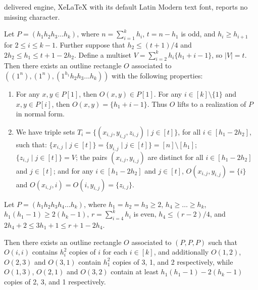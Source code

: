 \documentclass[10pt,a4paper]{amsart}
\begin{document}
delivered engine, XeLaTeX with its default Latin Modern text font, reports no missing character.
\begin{lemma}
\label{circulant_construction}
    Let $P=(h_1h_2h_3\dots h_k)$, where $n=\sum_{i=1}^k h_i$, $t=n-h_1$ is odd, and $h_i\ge h_{i+1}$ for $2\le i \le k-1$. Further suppose that $h_2 \le (t+1)/4$ and $2h_2 \le h_1 \le t+1-2h_2$.
    Define a multiset $V = \sum_{i=2}^k h_i\{h_1+i-1\}$, so $|V|=t$.
    Then there exists an outline rectangle $O$ associated to $((1^n), (1^n), (1^{h_1}h_2h_3\dots h_k))$ with the following properties:
    \begin{enumerate}
        \item For any $x,y \in P[1]$, then $O(x,y)\in P[1]$. For any
        $i \in [k]\setminus \{1\}$ and $x,y \in P[i]$, then $O(x,y)=\{h_1+i-1\}$. Thus $O$ lifts to a realization of $P$ in normal form.
        \item We have triple sets $T_i=\{(x_{i,j},y_{i,j},z_{i,j}) \mid j\in [t]\}$, for all $i\in [h_1-2h_2]$, such that: $\{x_{i,j} \mid j\in [t]\}=\{y_{i,j} \mid j\in [t]\} =  [n]\setminus [h_1]$; $\{z_{i,j} \mid j\in [t]\}=V$; the pairs $(x_{i,j},y_{i,j})$ are distinct for all $i\in [h_1-2h_2]$ and $j \in [t]$; and for any $i\in [h_1-2h_2]$ and $j \in [t]$, $O(x_{i,j},y_{i,j})=\{i\}$ and $O(x_{i,j},i)=O(i,y_{i,j})=\{z_{i,j}\}$.
    \end{enumerate}
\end{lemma}

\begin{lemma}
\label{even_r_from_circulant}
    Let $P=(h_1h_2h_3h_4\dots h_k)$, where $h_1=h_2=h_3\ge 2$, $h_4 \ge \dots \ge h_k$, $h_1(h_1-1)\geq 2(h_k-1)$, $r=\sum_{i=4}^k h_i$ is even, $h_4 \le (r-2)/4$, and 
    $2h_4+2 \le 3h_1+1 \le r+1-2h_4$.
    
    Then there exists an outline rectangle $O$ associated to $(P,P,P)$ such that $O(i,i)$ contains $h_i^2$ copies of $i$ for each $i\in [k]$, and additionally $O(1,2)$, $O(2,3)$ and $O(3,1)$ contain $h_1^2$ copies of 3, 1, and 2 respectively, while 
    $O(1,3)$, $O(2,1)$ and $O(3,2)$ contain at least $h_1(h_1-1)-2(h_k-1)$ copies of 2, 3, and 1 respectively.

\end{lemma}
\end{document}
